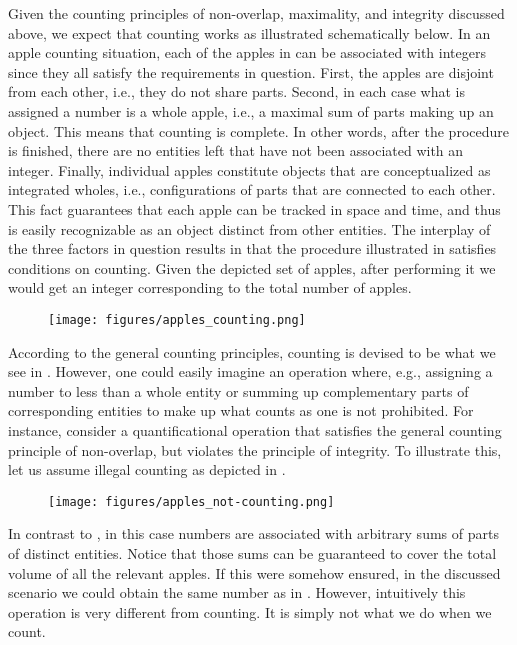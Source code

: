 Given the counting principles of non-overlap, maximality, and integrity discussed above, we expect that counting works as illustrated schematically below. In an apple counting situation, each of the apples in  can be associated with integers since they all satisfy the requirements in question. First, the apples are disjoint from each other, i.e., they do not share parts. Second, in each case what is assigned a number is a whole apple, i.e., a maximal sum of parts making up an object. This means that counting is complete. In other words, after the procedure is finished, there are no entities left that have not been associated with an integer. Finally, individual apples constitute objects that are conceptualized as integrated wholes, i.e., configurations of parts that are connected to each other. This fact guarantees that each apple can be tracked in space and time, and thus is easily recognizable as an object distinct from other entities. The interplay of the three factors in question results in that the procedure illustrated in  satisfies conditions on counting. Given the depicted set of apples, after performing it we would get an integer corresponding to the total number of apples.

\begin{figure}[h!]
\centering
\texttt{[image: figures/apples\_counting.png]}
\label{fig:counting}
\end{figure}

According to the general counting principles, counting is devised to be what we see in . However, one could easily imagine an operation where, e.g., assigning a number to less than a whole entity or summing up complementary parts of corresponding entities to make up what counts as one is not prohibited. For instance, consider a quantificational operation that satisfies the general counting principle of non-overlap, but violates the principle of integrity. To illustrate this, let us assume illegal counting as depicted in .

\begin{figure}[h!]
\centering
\texttt{[image: figures/apples\_not-counting.png]}
\label{fig:illegal-counting}
\end{figure}

In contrast to , in this case numbers are associated with arbitrary sums of parts of distinct entities. Notice that those sums can be guaranteed to cover the total volume of all the relevant apples. If this were somehow ensured, in the discussed scenario we could obtain the same number as in . However, intuitively this operation is very different from counting. It is simply not what we do when we count.

